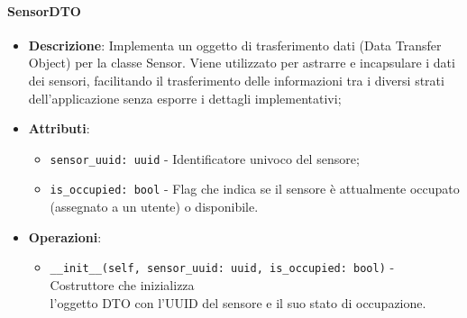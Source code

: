 \documentclass[10pt]{article}
\begin{document}
    \paragraph{SensorDTO}
    \begin{itemize} 
    \item \textbf{Descrizione}: Implementa un oggetto di trasferimento dati (Data Transfer Object) per la classe Sensor. Viene utilizzato per astrarre e incapsulare i dati dei sensori, facilitando il trasferimento delle informazioni tra i diversi strati dell'applicazione senza esporre i dettagli implementativi;
    \item \textbf{Attributi}:
    \begin{itemize}
        \item \texttt{sensor\_uuid: uuid} - Identificatore univoco del sensore;
        \item \texttt{is\_occupied: bool} - Flag che indica se il sensore è attualmente occupato (assegnato a un utente) o disponibile.
    \end{itemize}
    
    \item \textbf{Operazioni}:
    \begin{itemize}
        \item \texttt{\_\_init\_\_(self, sensor\_uuid: uuid, is\_occupied: bool)} - Costruttore che inizializza\\ l'oggetto DTO con l'UUID del sensore e il suo stato di occupazione.
    \end{itemize}
    \end{itemize}
\end{document}
